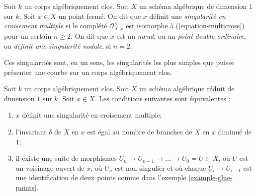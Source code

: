 \begin{definition}
\label{definition-multicross}
Soit $k$ un corps algébriquement clos. Soit $X$ un schéma algébrique de dimension $1$ sur $k$. Soit $x \in X$ un point fermé. On dit que $x$ définit une {\it singularité en croisement multiple} si le complété $\mathcal{O}_{X, x}^\wedge$ est isomorphe à (\ref{equation-multicross}) pour un certain $n \geq 2$. On dit que $x$ est un {\it nœud}, ou un {\it point double ordinaire}, ou {\it définit une singularité nodale}, si $n = 2$.
\end{definition}

\noindent
Ces singularités sont, en un sens, les singularités les plus simples que puisse présenter une courbe sur un corps algébriquement clos.

\begin{lemma}
\label{lemma-multicross}
Soit $k$ un corps algébriquement clos. Soit $X$ un schéma algébrique réduit de dimension $1$ sur $k$. Soit $x \in X$. Les conditions suivantes sont équivalentes : \begin{enumerate} \item $x$ définit une singularité en croisement multiple; \item l'invariant $\delta$ de $X$ en $x$ est égal au nombre de branches de $X$ en $x$ diminué de $1$; \item il existe une suite de morphismes $U_n \to U_{n - 1} \to \ldots \to U_0 = U \subset X$, où $U$ est un voisinage ouvert de $x$, où $U_n$ est non singulier et où chaque $U_i \to U_{i - 1}$ est une identification de deux points comme dans l'exemple \ref{example-glue-points}.
\end{enumerate}
\end{lemma}

